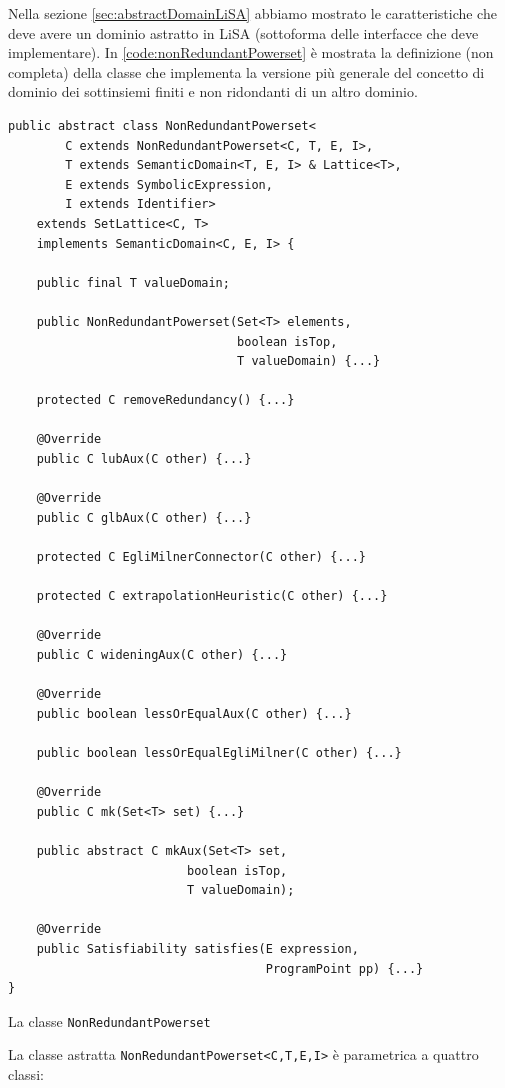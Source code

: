 Nella sezione \ref{sec:abstractDomainLiSA} abbiamo mostrato le caratteristiche che deve avere un dominio astratto in LiSA (sottoforma delle interfacce che deve implementare). In \ref{code:nonRedundantPowerset} è mostrata la definizione (non completa) della classe che implementa la versione più generale del concetto di dominio dei sottinsiemi finiti e non ridondanti di un altro dominio.
\begin{algorithm}
\lstset{frame=none}
\begin{lstlisting}[belowskip=-1.1 \baselineskip]
public abstract class NonRedundantPowerset<
        C extends NonRedundantPowerset<C, T, E, I>,
        T extends SemanticDomain<T, E, I> & Lattice<T>,
        E extends SymbolicExpression,
        I extends Identifier> 
    extends SetLattice<C, T> 
    implements SemanticDomain<C, E, I> {

    public final T valueDomain;
	
    public NonRedundantPowerset(Set<T> elements, 
                                boolean isTop, 
                                T valueDomain) {...}
    
    protected C removeRedundancy() {...}
    
    @Override
    public C lubAux(C other) {...}
    
    @Override
    public C glbAux(C other) {...}
    
    protected C EgliMilnerConnector(C other) {...}
    
    protected C extrapolationHeuristic(C other) {...}
    
    @Override
    public C wideningAux(C other) {...}
    
    @Override
    public boolean lessOrEqualAux(C other) {...}
    
    public boolean lessOrEqualEgliMilner(C other) {...}
    
    @Override
    public C mk(Set<T> set) {...}
    
    public abstract C mkAux(Set<T> set, 
                         boolean isTop, 
                         T valueDomain);
    
    @Override
    public Satisfiability satisfies(E expression, 
                                    ProgramPoint pp) {...}
}
\end{lstlisting}
\caption{La classe \texttt{NonRedundantPowerset}}
\label{code:nonRedundantPowerset}
\end{algorithm}
La classe astratta \texttt{NonRedundantPowerset<C,T,E,I>} è parametrica a quattro classi:
